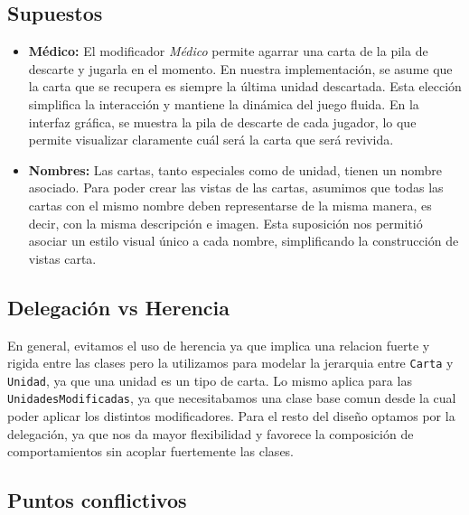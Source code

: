 \documentclass[titlepage,a4paper]{article}
\begin{document}
	\subsection{Supuestos}\label{sup:intro}
	\begin{itemize}
		\item \textbf{Médico:} El modificador \textit{Médico} permite agarrar una carta de la pila de descarte y jugarla en el momento.
		En nuestra implementación, se asume que la carta que se recupera es siempre la última unidad descartada. Esta elección simplifica la interacción y mantiene la dinámica del juego fluida. En la interfaz gráfica, se muestra la pila de descarte de cada jugador, lo que permite visualizar claramente cuál será la carta que será revivida.

		\item \textbf{Nombres:} Las cartas, tanto especiales como de unidad, tienen un nombre asociado. Para poder crear las vistas de las cartas, asumimos que todas las cartas con el mismo nombre deben representarse de la misma manera, es decir, con la misma descripción e imagen. Esta suposición nos permitió asociar un estilo visual único a cada nombre, simplificando la construcción de vistas carta.

	\end{itemize}

	\subsection{Delegación vs Herencia}\label{sup:vs}
	En general, evitamos el uso de herencia ya que implica una relacion fuerte y rigida entre las clases pero la utilizamos para modelar la jerarquia entre \texttt{Carta} y \texttt{Unidad}, ya que una unidad es un tipo de carta. Lo mismo aplica para las \texttt{UnidadesModificadas}, ya que necesitabamos una clase base comun desde la cual poder aplicar los distintos modificadores.
	Para el resto del diseño optamos por la delegación, ya que nos da mayor flexibilidad y favorece la composición de comportamientos sin acoplar fuertemente las clases.

	\subsection{Puntos conflictivos}\label{sup:conflicto}
\end{document}
